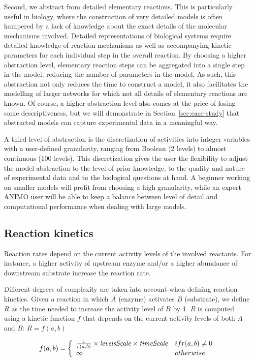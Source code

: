 \documentclass[journal, 10pt]{IEEEtran}
\begin{document}
Second, we abstract from detailed elementary reactions. This is particularly useful in 
biology, where the construction of very detailed models is often hampered by 
a lack of knowledge about the exact details of the molecular mechanisms involved. 
Detailed representations of biological systems require detailed knowledge of reaction mechanisms as well as 
accompanying kinetic parameters for each individual step in the overall reaction. 
By choosing a higher abstraction level, elementary reaction steps can be aggregated into a single step in the model, reducing
the number of parameters in the model. As such, this abstraction not only reduces the time to construct a model, it also facilitates the modelling of larger networks
for which not all details of elementary reactions are known. 
Of course, a higher abstraction level also comes at the price of losing some descriptiveness, but we will demonstrate
in Section~\ref{sec:case-study} that abstracted models can capture experimental data in a meaningful way.

A third level of abstraction is the discretization of activities into integer variables with a user-defined granularity, ranging from Boolean (2 levels) 
to almost continuous (100 levels). This discretization gives the user the flexibility to adjust the model abstraction to the level of 
prior knowledge, to the quality and nature of experimental data and to the biological questions at hand.
A beginner working on smaller models will profit from choosing a high granularity, while
an expert ANIMO user will be able to keep a balance between level of detail and computational performance when dealing with large models.


\subsection{Reaction kinetics}\label{sec:modeling-framework}
Reaction rates depend on the current activity levels of the involved reactants. For instance, a higher activity of upstream enzyme and/or a higher abundance of 
downstream substrate increase the reaction rate. 

Different degrees of complexity are taken into account when defining reaction kinetics. Given a reaction in which $A$ (enzyme) activates $B$ (substrate), we define $R$ as the time needed to increase the activity level of $B$ by 1. $R$ is computed using a kinetic function $f$ that
depends on the current activity levels of both $A$ and $B$: $R = f(a, b)$

$$
f(a, b) = \left\{ \begin{array}{ll}
		      \frac{1}{r(a, b)} \times \mbox{\it levelsScale} \times \mbox{\it timeScale} & \mbox{ if } r(a, b) \neq 0 \\
		      \infty & \mbox{ otherwise}
                  \end{array} \right.
$$
\end{document}
